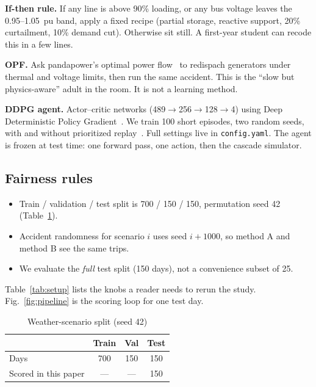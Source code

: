 \documentclass[conference]{IEEEtran}
\begin{document}
\textbf{If-then rule.} If any line is above 90\% loading, or any bus voltage leaves the 0.95--1.05~pu band, apply a fixed recipe (partial storage, reactive support, 20\% curtailment, 10\% demand cut). Otherwise sit still. A first-year student can recode this in a few lines.

\textbf{OPF.} Ask pandapower's optimal power flow~\cite{b4} to redispach generators under thermal and voltage limits, then run the same accident. This is the ``slow but physics-aware'' adult in the room. It is not a learning method.

\textbf{DDPG agent.} Actor--critic networks (489$\rightarrow$256$\rightarrow$128$\rightarrow$4) using Deep Deterministic Policy Gradient~\cite{b5}. We train 100 short episodes, two random seeds, with and without prioritized replay~\cite{b6}. Full settings live in \texttt{config.yaml}. The agent is frozen at test time: one forward pass, one action, then the cascade simulator.

\subsection{Fairness rules}

\begin{itemize}
\item Train / validation / test split is 700 / 150 / 150, permutation seed 42 (Table~\ref{tab:dataset}).
\item Accident randomness for scenario $i$ uses seed $i+1000$, so method A and method B see the same trips.
\item We evaluate the \emph{full} test split (150 days), not a convenience subset of 25.
\end{itemize}

Table~\ref{tab:setup} lists the knobs a reader needs to rerun the study. Fig.~\ref{fig:pipeline} is the scoring loop for one test day.

\begin{table}[t]
\centering
\caption{Weather-scenario split (seed 42)}
\label{tab:dataset}
\begin{tabular}{lccc}
\toprule
 & Train & Val & Test \\
\midrule
Days & 700 & 150 & 150 \\
Scored in this paper & --- & --- & 150 \\
\bottomrule
\end{tabular}
\end{table}
\end{document}
